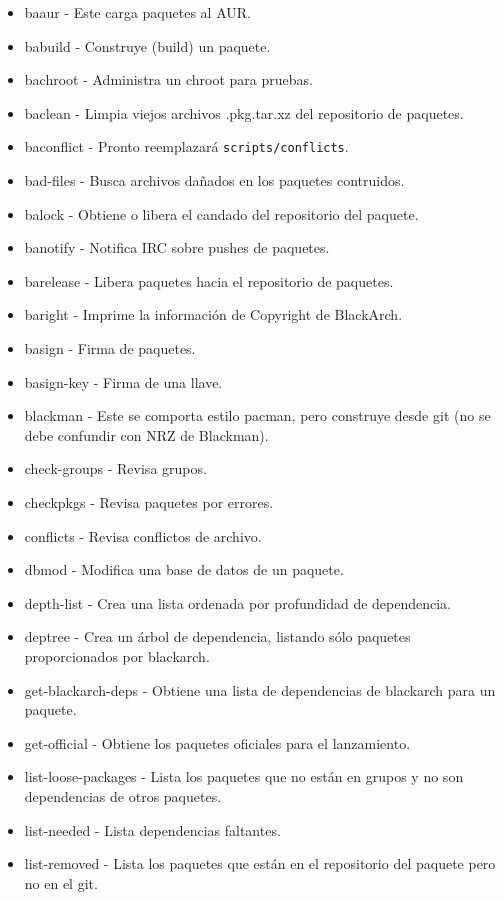 \documentclass[a4paper, oneside, 11pt]{book}
\begin{document}
\begin{itemize}
\item baaur - Este carga paquetes al AUR.
\item babuild - Construye (build) un paquete.
\item bachroot - Administra un chroot para pruebas.
\item baclean - Limpia viejos archivos .pkg.tar.xz del repositorio de paquetes.
\item baconflict - Pronto reemplazará \verb|scripts/conflicts|.
\item bad-files - Busca archivos dañados en los paquetes contruidos.
\item balock - Obtiene o libera el candado del repositorio del paquete.
\item banotify - Notifica IRC sobre pushes de paquetes.
\item barelease - Libera paquetes hacia el repositorio de paquetes.
\item baright - Imprime la información de Copyright de BlackArch.
\item basign - Firma de paquetes.
\item basign-key - Firma de una llave.
\item blackman - Este se comporta estilo pacman, pero construye desde git (no se debe confundir con 
    NRZ de Blackman).
\item check-groups - Revisa grupos.
\item checkpkgs - Revisa paquetes por errores.
\item conflicts - Revisa conflictos de archivo.
\item dbmod - Modifica una base de datos de un paquete.
\item depth-list - Crea una lista ordenada por profundidad de dependencia.
\item deptree - Crea un árbol de dependencia, listando sólo paquetes proporcionados por blackarch.
\item get-blackarch-deps - Obtiene una lista de dependencias de blackarch para un paquete.
\item get-official - Obtiene los paquetes oficiales para el lanzamiento.
\item list-loose-packages - Lista los paquetes que no están en grupos y no son
    dependencias de otros paquetes.
\item list-needed - Lista dependencias faltantes.
\item list-removed - Lista los paquetes que están en el repositorio del paquete pero no en el git.

\end{itemize}
\end{document}
